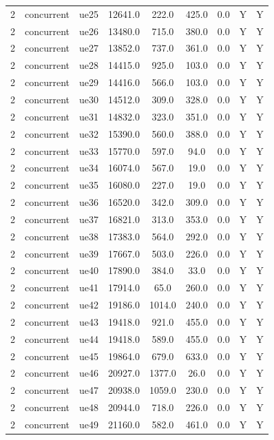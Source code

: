 \begin{table}[ht]
\begin{tabular}{|c|c|c|c|c|c|c|c|c|}
2 & concurrent & ue25 & 12641.0 & 222.0 & 425.0 & 0.0 & Y & Y \\
2 & concurrent & ue26 & 13480.0 & 715.0 & 380.0 & 0.0 & Y & Y \\
2 & concurrent & ue27 & 13852.0 & 737.0 & 361.0 & 0.0 & Y & Y \\
2 & concurrent & ue28 & 14415.0 & 925.0 & 103.0 & 0.0 & Y & Y \\
2 & concurrent & ue29 & 14416.0 & 566.0 & 103.0 & 0.0 & Y & Y \\
2 & concurrent & ue30 & 14512.0 & 309.0 & 328.0 & 0.0 & Y & Y \\
2 & concurrent & ue31 & 14832.0 & 323.0 & 351.0 & 0.0 & Y & Y \\
2 & concurrent & ue32 & 15390.0 & 560.0 & 388.0 & 0.0 & Y & Y \\
2 & concurrent & ue33 & 15770.0 & 597.0 & 94.0 & 0.0 & Y & Y \\
2 & concurrent & ue34 & 16074.0 & 567.0 & 19.0 & 0.0 & Y & Y \\
2 & concurrent & ue35 & 16080.0 & 227.0 & 19.0 & 0.0 & Y & Y \\
2 & concurrent & ue36 & 16520.0 & 342.0 & 309.0 & 0.0 & Y & Y \\
2 & concurrent & ue37 & 16821.0 & 313.0 & 353.0 & 0.0 & Y & Y \\
2 & concurrent & ue38 & 17383.0 & 564.0 & 292.0 & 0.0 & Y & Y \\
2 & concurrent & ue39 & 17667.0 & 503.0 & 226.0 & 0.0 & Y & Y \\
2 & concurrent & ue40 & 17890.0 & 384.0 & 33.0 & 0.0 & Y & Y \\
2 & concurrent & ue41 & 17914.0 & 65.0 & 260.0 & 0.0 & Y & Y \\
2 & concurrent & ue42 & 19186.0 & 1014.0 & 240.0 & 0.0 & Y & Y \\
2 & concurrent & ue43 & 19418.0 & 921.0 & 455.0 & 0.0 & Y & Y \\
2 & concurrent & ue44 & 19418.0 & 589.0 & 455.0 & 0.0 & Y & Y \\
2 & concurrent & ue45 & 19864.0 & 679.0 & 633.0 & 0.0 & Y & Y \\
2 & concurrent & ue46 & 20927.0 & 1377.0 & 26.0 & 0.0 & Y & Y \\
2 & concurrent & ue47 & 20938.0 & 1059.0 & 230.0 & 0.0 & Y & Y \\
2 & concurrent & ue48 & 20944.0 & 718.0 & 226.0 & 0.0 & Y & Y \\
2 & concurrent & ue49 & 21160.0 & 582.0 & 461.0 & 0.0 & Y & Y \\

\end{tabular}
\end{table}
